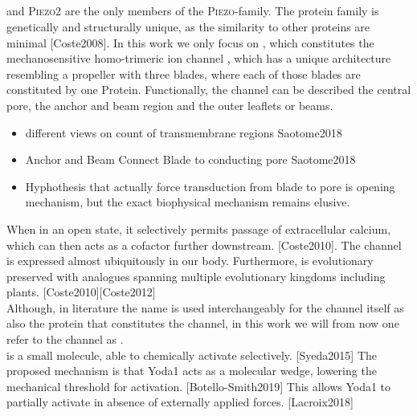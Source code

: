 \subsection{\Piezo{}}


\Piezo{} and \textsc{Piezo2} are the only members of the \textsc{Piezo}-family. The protein family is genetically and structurally unique, as the similarity to other proteins are minimal [Coste2008]. In this work we only focus on \Piezo{}, which constitutes the mechanosensitive homo-trimeric ion channel \Piezo{}, which has a unique architecture resembling a propeller with three blades, where each of those blades are constituted by one \Piezo{} Protein. Functionally, the channel can be described the central pore, the anchor and beam region and the outer leaflets or beams. 

\begin{itemize}
	\item different views on count of transmembrane regions Saotome2018
	\item Anchor and Beam Connect Blade to conducting pore Saotome2018
	\item Hyphothesis that actually force transduction from blade to pore is opening mechanism, but the exact biophysical mechanism remains elusive. 
\end{itemize}

 When in an open state, it selectively permits passage of extracellular calcium, which can then acts as a cofactor further downstream. [Coste2010]. The channel is expressed almost ubiquitously in our body. Furthermore, \Piezo{} is evolutionary preserved with analogues spanning multiple evolutionary kingdoms including plants. [Coste2010][Coste2012]\\
Although, in literature the name \Piezo{} is used interchangeably for the channel itself as also the protein that constitutes the channel, in this work we will from now one refer to the channel as \Piezo{}.\\
\Yoda{} is a small molecule, able to chemically activate \Piezo{} selectively. [Syeda2015] The proposed mechanism is that Yoda1 acts as a molecular wedge, lowering the mechanical threshold for activation. [Botello-Smith2019] This allows Yoda1 to partially activate \Piezo{} in absence of externally applied forces. [Lacroix2018]


